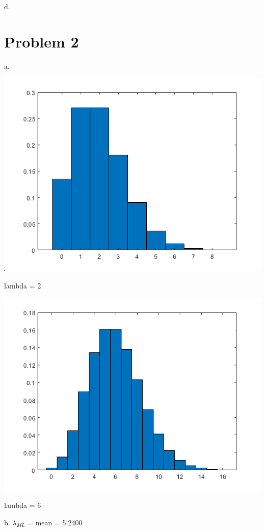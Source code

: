 \documentclass[a4paper]{article}
\begin{document}
d. 


\section{Problem 2}
a.

\begin{center}
    \includegraphics[scale=1]{2a-1.png}
    \caption{lambda = 2}
\end{center}

\begin{center}
    \includegraphics[scale=1]{2a-2.png}
    \caption{lambda = 6}
\end{center}

b. 
$\lambda_{ML}$ = mean = 5.2400
\end{document}
